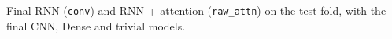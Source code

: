 \begin{table}[htbp]
\centering
\caption[Recurrent networks: final models (test)]{Final RNN (\texttt{conv}) and RNN + attention (\texttt{raw\_attn}) on the test fold, with the final CNN, Dense and trivial models.}
\label{tab:rnn_final}
\small
\begin{adjustbox}{max width=\textwidth}

\end{adjustbox}
\end{table}
